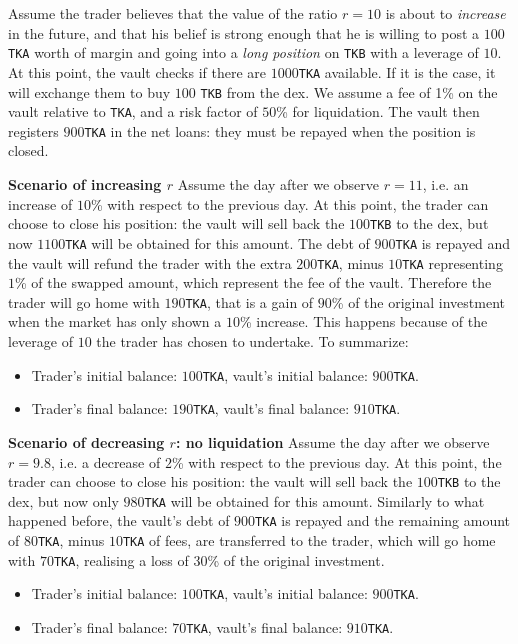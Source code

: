 \documentclass[a4paper,10 pt]{article}
\theoremstyle{definition}
\begin{document}
Assume the trader believes that the value of the ratio $r = 10$ is about to \emph{increase} in the future, and that his belief is strong enough that he is willing to post a $100$\verb|TKA| worth of margin and going into a \emph{long position} on \verb|TKB| with a leverage of $10$. At this point, the vault checks if there are $1000$\verb|TKA| available. If it is the case, it will exchange them to buy $100$ \verb|TKB| from the dex. We assume a fee of 1\% on the vault relative to \verb|TKA|, and a risk factor of $50$\% for liquidation. The vault then registers $900$\verb|TKA| in the net loans: they must be repayed when the position is closed.

\textbf{Scenario of increasing $r$}
Assume the day after we observe $r = 11$, i.e. an increase of $10$\% with respect to the previous day. At this point, the trader can choose to close his position: the vault will sell back the $100$\verb|TKB| to the dex, but now $1100$\verb|TKA| will be obtained for this amount. The debt of $900$\verb|TKA| is repayed and the vault will refund the trader with the extra $200$\verb|TKA|, minus $10$\verb|TKA| representing $1$\% of the swapped amount, which represent the fee of the vault. Therefore the trader will go home with $190$\verb|TKA|, that is a gain of $90$\% of the original investment when the market has only shown a $10$\% increase. This happens because of the leverage of $10$ the trader has chosen to undertake. To summarize:
\begin{itemize}
    \item Trader's initial balance: $100$\verb|TKA|, vault's initial balance: $900$\verb|TKA|.
    \item Trader's final balance: $190$\verb|TKA|, vault's final balance: $910$\verb|TKA|.
\end{itemize}

\textbf{Scenario of decreasing $r$: no liquidation}
Assume the day after we observe $r = 9.8$, i.e. a decrease of $2$\% with respect to the previous day.  At this point, the trader can choose to close his position: the vault will sell back the $100$\verb|TKB| to the dex, but now only $980$\verb|TKA| will be obtained for this amount. Similarly to what happened before, the vault's debt of $900$\verb|TKA| is repayed and the remaining amount of $80$\verb|TKA|, minus $10$\verb|TKA| of fees, are transferred to the trader, which will go home with $70$\verb|TKA|, realising a loss of $30$\% of the original investment.
\begin{itemize}
    \item Trader's initial balance: $100$\verb|TKA|, vault's initial balance: $900$\verb|TKA|.
    \item Trader's final balance: $70$\verb|TKA|, vault's final balance: $910$\verb|TKA|.
\end{itemize}
\end{document}

